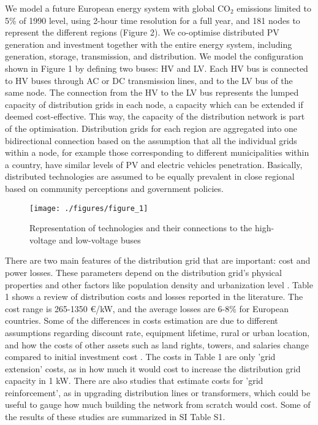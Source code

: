 \documentclass[review]{elsarticle}
\begin{document}
We model a future European energy system with global $\mathrm{CO_2}$ emissions limited to 5\% of 1990 level, using 2-hour time resolution for a full year, and 181 nodes to represent the different regions (Figure 2). We co-optimise distributed PV generation and investment together with the entire energy system, including generation, storage, transmission, and distribution. We model the configuration shown in Figure 1 by defining two buses: HV and LV. Each HV bus is connected to HV buses through AC or DC transmission lines, and to the LV bus of the same node. The connection from the HV to the LV bus represents the lumped capacity of distribution grids in each node, a capacity which can be extended if deemed cost-effective. This way, the capacity of the distribution network is part of the optimisation. Distribution grids for each region are aggregated into one bidirectional connection based on the assumption that all the individual grids within a node, for example those corresponding to different municipalities within a country, have similar levels of PV and electric vehicles penetration. Basically, distributed technologies are assumed to be equally prevalent in close regional based on community perceptions and government policies. 

 
\begin{figure}[!htb]
    \texttt{[image: ./figures/figure\_1]}
   \caption{\textbf{} Representation of technologies and their connections to the high-voltage and low-voltage buses}
   \label{fig:pypsa}
\end{figure}

There are two main features of the distribution grid that are important: cost and power losses. These parameters depend on the distribution grid's physical properties and other factors like population density and urbanization level \cite{sadovskaia_2019}. Table 1 shows a review of distribution costs and losses reported in the literature. The cost range is 265-1350 €/kW, and the average losses are 6-8\% for European countries. Some of the differences in costs estimation are due to different assumptions regarding discount rate, equipment lifetime, rural or urban location, and how the costs of other assets such as land rights, towers, and salaries change compared to initial investment cost \cite{gupta_2021,rauschkolb_2021}. The costs in Table 1 are only 'grid extension' costs, as in how much it would cost to increase the distribution grid capacity in 1 kW. There are also studies that estimate costs for 'grid reinforcement', as in upgrading distribution lines or transformers, which could be useful to gauge how much building the network from scratch would cost. Some of the results of these studies are summarized in SI Table S1. 
 
\end{document}
